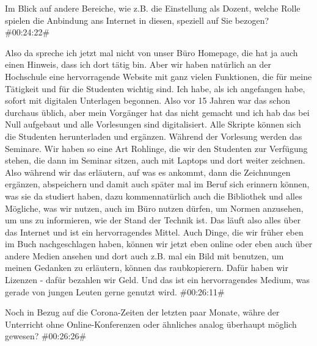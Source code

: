 \begin{description}
\Fabian Im Blick auf andere Bereiche, wie z.B. die Einstellung als Dozent, welche Rolle spielen die Anbindung ans Internet in diesen, speziell auf Sie bezogen? \#00:24:22\#

\Andre Also da spreche ich jetzt mal nicht von unser Büro Homepage, die hat ja auch einen Hinweis, dass ich dort tätig bin. Aber wir haben natürlich an der Hochschule eine hervorragende Website mit ganz vielen Funktionen, die für meine Tätigkeit und für die Studenten wichtig sind. Ich habe, als ich angefangen habe, sofort mit digitalen Unterlagen begonnen. Also vor 15 Jahren war das schon durchaus üblich, aber mein Vorgänger hat das nicht gemacht und ich hab das bei Null aufgebaut und alle Vorlesungen sind digitalisiert. Alle Skripte können sich die Studenten herunterladen und ergänzen. Während der Vorlesung werden das Seminare. Wir haben so eine Art Rohlinge, die wir den Studenten zur Verfügung stehen, die dann im Seminar sitzen, auch mit Laptops und dort weiter zeichnen. Also während wir das erläutern, auf was es ankommt, dann die Zeichnungen ergänzen, abspeichern und damit auch später mal im Beruf sich erinnern können, was sie da studiert haben, dazu kommennatürlich auch die Bibliothek und alles Mögliche, was wir nutzen, auch im Büro nutzen dürfen, um Normen anzusehen, um uns zu informieren, wie der Stand der Technik ist. Das läuft also alles über das Internet und ist ein hervorragendes Mittel. Auch Dinge, die wir früher eben im Buch nachgeschlagen haben, können wir jetzt eben online oder eben auch über andere Medien ansehen und dort auch z.B. mal ein Bild mit benutzen, um meinen Gedanken zu erläutern, können das raubkopierern. Dafür haben wir Lizenzen - dafür bezahlen wir Geld. Und das ist ein hervorragendes Medium, was gerade von jungen Leuten gerne genutzt wird. \#00:26:11\#

\Fabian Noch in Bezug auf die Corona-Zeiten der letzten paar Monate, währe der Unterricht ohne Online-Konferenzen oder ähnliches analog überhaupt möglich gewesen? \#00:26:26\#


\end{description}
